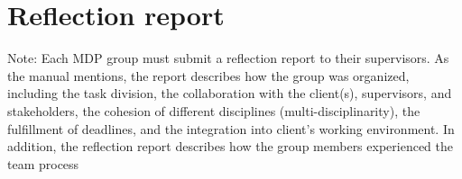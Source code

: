 \chapter{Reflection report}
Note:  Each MDP group must submit a reflection report to their supervisors. As the manual mentions, the report describes how the group was organized, including the task division, the collaboration with the client(s), supervisors, and stakeholders, the cohesion of different disciplines (multi-disciplinarity), the fulfillment of deadlines, and the integration into client’s working environment. In addition, the reflection report describes how the group members experienced the team process